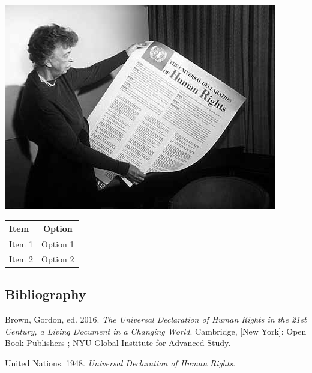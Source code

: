 \documentclass[
]{beamer}
\newlength{\cslhangindent}
\newlength{\cslentryspacingunit} %
\newenvironment{CSLReferences}[2] %
 {%
  \setlength{\parindent}{0pt}
  \ifodd #1
  \let\oldpar\par
  \def\par{\hangindent=\cslhangindent\oldpar}
  \fi
  \setlength{\parskip}{#2\cslentryspacingunit}
 }%
 {}
\begin{document}
\includegraphics[width=\textwidth,height=0.5\textheight]{images/Eleanor_Roosevelt_and_Human_Rights_Declaration.jpeg}

\begin{longtable}[]{@{}lc@{}}
\toprule\noalign{}
\textbf{Item} & \textbf{Option} \\
\midrule\noalign{}
\endhead
\bottomrule\noalign{}
\endlastfoot
Item 1 & Option 1 \\
Item 2 & Option 2 \\
\end{longtable}

\hypertarget{bibliography}{%
\subsection{Bibliography}\label{bibliography}}

\hypertarget{refs}{}
\begin{CSLReferences}{1}{0}
\leavevmode{}%
Brown, Gordon, ed. 2016. \emph{The {Universal} {Declaration} of {Human}
{Rights} in the 21st Century, a Living Document in a Changing World}.
Cambridge, {[}New York{]}: Open Book Publishers ; NYU Global Institute
for Advanced Study.

\leavevmode{}%
United Nations. 1948. \emph{Universal Declaration of Human Rights}.

\end{CSLReferences}
\end{document}
